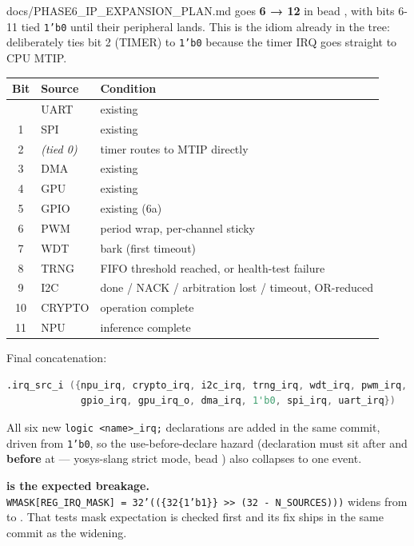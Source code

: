 \begin{relocated}{docs/PHASE6_IP_EXPANSION_PLAN.md}
 goes  \textbf{6 → 12} in
bead , with bits 6-11 tied \texttt{1'b0} until their
peripheral lands. This is the idiom already in the tree:
 deliberately ties bit 2 (TIMER) to
\texttt{1'b0} because the timer IRQ goes straight to CPU MTIP.

{
\begin{longtable}[]{@{}cll@{}}
\toprule\noalign{}
Bit & Source & Condition \\
\midrule\noalign{}
\endhead
\bottomrule\noalign{}
\endlastfoot
0 & UART & existing \\
1 & SPI & existing \\
2 & \emph{(tied 0)} & timer routes to MTIP directly \\
3 & DMA & existing \\
4 & GPU & existing \\
5 & GPIO & existing (6a) \\
6 & PWM & period wrap, per-channel sticky \\
7 & WDT & bark (first timeout) \\
8 & TRNG & FIFO threshold reached, or health-test failure \\
9 & I2C & done / NACK / arbitration lost / timeout, OR-reduced \\
10 & CRYPTO & operation complete \\
11 & NPU & inference complete \\
\end{longtable}
}

Final concatenation:

\begin{lstlisting}[language=Verilog]
.irq_src_i ({npu_irq, crypto_irq, i2c_irq, trng_irq, wdt_irq, pwm_irq,
             gpio_irq, gpu_irq_o, dma_irq, 1'b0, spi_irq, uart_irq})
\end{lstlisting}

All six new \texttt{logic\ <name>\_\allowbreak{}irq;} declarations are
added in the same commit, driven from \texttt{1'b0}, so the
use-before-declare hazard (declaration must sit after
 and \textbf{before}  at
 --- yosys-slang strict mode, bead ) also collapses
to one event.

\warn{} \textbf{ is the expected breakage.}
\texttt{WMASK[REG\_\allowbreak{}IRQ\_\allowbreak{}MASK]\ =\allowbreak{}\ 32'((\{32\{1'b1\}\}\ >>\ (32\ -\allowbreak{}\ N\_\allowbreak{}SOURCES)))}
widens from  to . That test\textquotesingle s
mask expectation is checked first and its fix ships in the same commit
as the widening.


\end{relocated}
